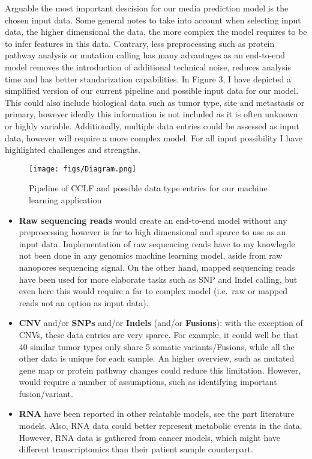 \documentclass[11pt,]{article}
\providecommand{\tightlist}{%
\setlength{\itemsep}{0pt}\setlength{\parskip}{0pt}}
\begin{document}
Arguable the most important descision for our media prediction model is
the chosen input data. Some general notes to take into account when
selecting input data, the higher dimensional the data, the more complex
the model requires to be to infer features in this data. Contrary, less
preprocessing such as protein pathway analysis or mutation calling has
many advantages as an end-to-end model removes the introduction of
additional technical noise, reduces analysis time and has better
standarization capabilities. In Figure 3, I have depicted a simplified
version of our current pipeline and possible input data for our model.
This could also include biological data such as tumor type, site and
metastasis or primary, however ideally this information is not included
as it is often unknown or highly variable. Additionally, multiple data
entries could be assessed as input data, however will require a more
complex model. For all input possibility I have highlighted challenges
and strengths.

\begin{figure}
\centering
\texttt{[image: figs/Diagram.png]}
\caption{Pipeline of CCLF and possible data type entries for our machine
learning application}
\end{figure}

\newpage

\begin{itemize}
\tightlist
\item
  \textbf{Raw sequencing reads} would create an end-to-end model without
  any preprocessing however is far to high dimensional and sparce to use
  as an input data. Implementation of raw sequencing reads have to my
  knowlegde not been done in any genomics machine learning model, aside
  from raw nanopores sequencing signal. On the other hand, mapped
  sequencing reads have been used for more elaborate tasks such as SNP
  and Indel calling, but even here this would require a far to complex
  model (i.e.~raw or mapped reads not an option as input data).
\item
  \textbf{CNV} and/or \textbf{SNPs} and/or \textbf{Indels} (and/or
  \textbf{Fusions}): with the exception of CNVs, these data entries are
  very sparce. For example, it could well be that 40 similar tumor types
  only share 5 somatic variants/Fusions, while all the other data is
  unique for each sample. An higher overview, such as mutated gene map
  or protein pathway changes could reduce this limitation. However,
  would require a number of assumptions, such as identifying important
  fusion/variant.
\item
  \textbf{RNA} have been reported in other relatable models, see the
  part literature models. Also, RNA data could better represent
  metabolic events in the data. However, RNA data is gathered from
  cancer models, which might have different transcriptomics than their
  patient sample counterpart.
\end{itemize}
\end{document}
